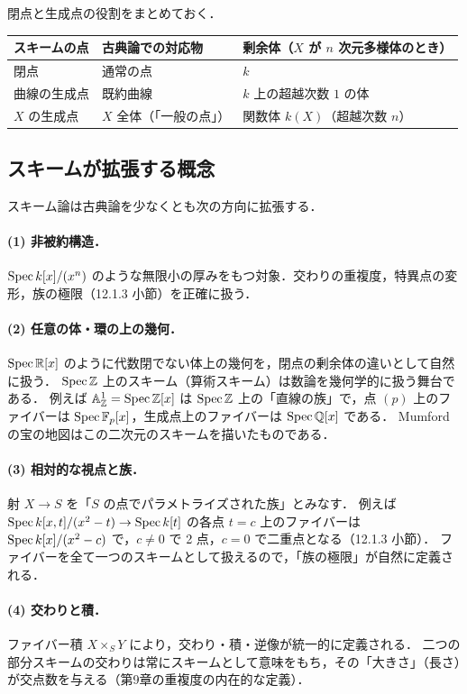 閉点と生成点の役割をまとめておく．
\begin{center}
\begin{tabular}{lll}
  \hline
  スキームの点 & 古典論での対応物 & 剰余体（$X$ が $n$ 次元多様体のとき）\\
  \hline
  閉点 & 通常の点 & $k$\\
  曲線の生成点 & 既約曲線 & $k$ 上の超越次数 $1$ の体\\
  $X$ の生成点 & $X$ 全体（「一般の点」） & 関数体 $k(X)$（超越次数 $n$）\\
  \hline
\end{tabular}
\end{center}

\subsection{スキームが拡張する概念}

スキーム論は古典論を少なくとも次の方向に拡張する．

\paragraph{(1) 非被約構造．}
$\operatorname{Spec} k[x]/(x^n)$ のような無限小の厚みをもつ対象．交わりの重複度，特異点の変形，族の極限（12.1.3 小節）を正確に扱う．

\paragraph{(2) 任意の体・環の上の幾何．}
$\operatorname{Spec}\mathbb{R}[x]$ のように代数閉でない体上の幾何を，閉点の剰余体の違いとして自然に扱う．
$\operatorname{Spec}\mathbb{Z}$ 上のスキーム（算術スキーム）は数論を幾何学的に扱う舞台である．
例えば $\mathbb{A}^1_{\mathbb{Z}}=\operatorname{Spec}\mathbb{Z}[x]$ は $\operatorname{Spec}\mathbb{Z}$ 上の「直線の族」で，点 $(p)$ 上のファイバーは $\operatorname{Spec}\mathbb{F}_p[x]$，生成点上のファイバーは $\operatorname{Spec}\mathbb{Q}[x]$ である．
Mumford の宝の地図はこの二次元のスキームを描いたものである．

\paragraph{(3) 相対的な視点と族．}
射 $X\to S$ を「$S$ の点でパラメトライズされた族」とみなす．
例えば $\operatorname{Spec} k[x,t]/(x^2-t)\to\operatorname{Spec} k[t]$ の各点 $t=c$ 上のファイバーは $\operatorname{Spec} k[x]/(x^2-c)$ で，$c\ne0$ で 2 点，$c=0$ で二重点となる（12.1.3 小節）．
ファイバーを全て一つのスキームとして扱えるので，「族の極限」が自然に定義される．

\paragraph{(4) 交わりと積．}
ファイバー積 $X\times_SY$ により，交わり・積・逆像が統一的に定義される．
二つの部分スキームの交わりは常にスキームとして意味をもち，その「大きさ」（長さ）が交点数を与える（第9章の重複度の内在的な定義）．

